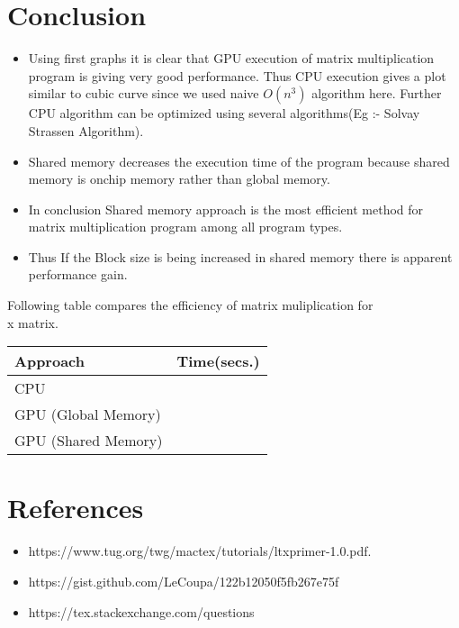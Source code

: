 \documentclass[12pt]{article}
\begin{document}

	\newpage
	\section{Conclusion}

	\begin{itemize}
		\item Using first graphs it is clear that GPU execution of matrix multiplication program is giving very good performance. Thus CPU execution gives a plot similar to cubic curve since we used naive $O(n^3)$ algorithm here. Further CPU algorithm can be optimized using several algorithms(Eg :- Solvay Strassen Algorithm).

		\item Shared memory decreases the execution time of the program because shared memory is onchip memory rather than global memory. 

		\item In conclusion Shared memory approach is the most efficient method for matrix multiplication program among all program types.

		\item Thus If the Block size is being increased in shared memory there is apparent performance gain.
	\end{itemize}

	\hfill \break
	Following table compares the efficiency of matrix muliplication for \\ x matrix.
	\hfill \break

	\begin{tabu} to 1 \textwidth { | X[l] | X[r] | }
		 \hline
		 Approach & Time(secs.)  \\
		 \hline
		 CPU &   \\
		 \hline
		 GPU (Global Memory) &   \\
		 \hline
		 GPU (Shared Memory) &   \\
		 \hline
	\end{tabu}		

	\newpage


	\section{References}

	\begin{itemize}
	  \item https://www.tug.org/twg/mactex/tutorials/ltxprimer-1.0.pdf.
	  \item https://gist.github.com/LeCoupa/122b12050f5fb267e75f
	  \item https://tex.stackexchange.com/questions
	\end{itemize}
\end{document}
